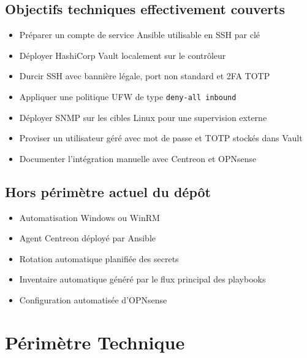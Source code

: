 \documentclass[11pt,a4paper]{article}
\begin{document}
\subsection{Objectifs techniques effectivement couverts}

\begin{itemize}
  \item Préparer un compte de service Ansible utilisable en SSH par clé
  \item Déployer HashiCorp Vault localement sur le contrôleur
  \item Durcir SSH avec bannière légale, port non standard et 2FA TOTP
  \item Appliquer une politique UFW de type \texttt{deny-all inbound}
  \item Déployer SNMP sur les cibles Linux pour une supervision externe
  \item Proviser un utilisateur géré avec mot de passe et TOTP stockés dans Vault
  \item Documenter l'intégration manuelle avec Centreon et OPNsense
\end{itemize}

\subsection{Hors périmètre actuel du dépôt}

\begin{itemize}
  \item Automatisation Windows ou WinRM
  \item Agent Centreon déployé par Ansible
  \item Rotation automatique planifiée des secrets
  \item Inventaire automatique généré par le flux principal des playbooks
  \item Configuration automatisée d'OPNsense
\end{itemize}

\section{Périmètre Technique}
\end{document}

